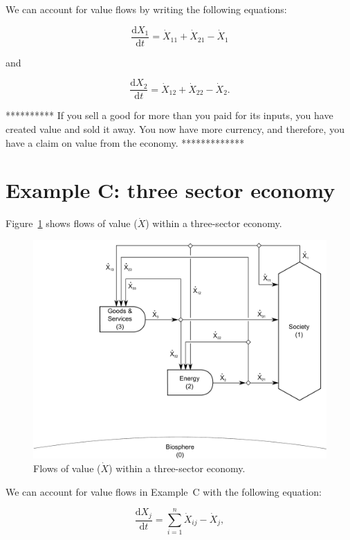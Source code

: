 We can account for value flows by writing
the following equations:

\begin{equation}
	\frac{\mathrm{d}X_{1}}{\mathrm{d}t}
	= \dot{X}_{11}
	+ \dot{X}_{21}
	- \dot{X}_{1}
\end{equation}

\noindent and

\begin{equation}
	\frac{\mathrm{d}X_{2}}{\mathrm{d}t}
	= \dot{X}_{12}
	+ \dot{X}_{22}
	- \dot{X}_{2}.
\end{equation}

**********
If you sell a good for more than you paid for its inputs, 
you have created value and sold it away. 
You now have more currency, and therefore, 
you have a claim on value from the economy.
*************




\section{Example C: three sector economy}

Figure~\ref{fig:C_value} shows flows of value ($\dot{X}$) 
within a three-sector economy. 

\begin{figure}[h!]
\centering
\includegraphics[width=0.8\linewidth]{Part_3/Chapter_Values/images/3_sector_value.pdf}
\caption{Flows of value ($\dot{X}$) within a three-sector economy.}
\label{fig:C_value}
\end{figure}

We can account for value flows in Example~C with the following equation:

\begin{equation}
	\frac{\mathrm{d}X_{j}}{\mathrm{d}t}
	= \sum\limits_{i=1}^{n} \dot{X}_{ij}
	- \dot{X}_{j},
\end{equation}

